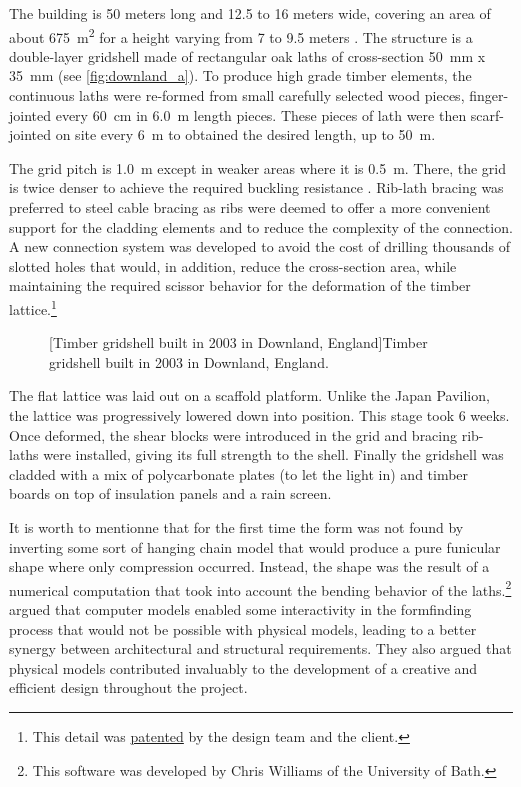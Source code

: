 The building is 50 meters long and 12.5 to 16 meters wide, covering an area of about \SI{675}{m^2} for a height varying from 7 to 9.5 meters \cite{Harris2002}. The structure is a double-layer gridshell made of rectangular oak laths of cross-section \SI{50}{mm} x \SI{35}{mm} (see \cref{fig:downland_a}). To produce high grade timber elements, the continuous laths were re-formed from small carefully selected wood pieces, finger-jointed every \SI{60}{cm} in \SI{6.0}{m} length pieces. These pieces of lath were then scarf-jointed on site every \SI{6}{m} to obtained the desired length, up to \SI{50}{m}.

The grid pitch is \SI{1.0}{m} except in weaker areas where it is \SI{0.5}{m}. There, the grid is twice denser to achieve the required buckling resistance \cite{Harris2003}. Rib-lath bracing was preferred to steel cable bracing as ribs were deemed to offer a more convenient support for the cladding elements and to reduce the complexity of the connection. A new connection system was developed to avoid the cost of drilling thousands of slotted holes that would, in addition, reduce the cross-section area, while maintaining the required scissor behavior for the deformation of the timber lattice.\footnote{This detail was \href{https://patents.google.com/patent/GB2361504A/en?q=\%22A+coupling+and+a+method+of+constructing+grid+shell+buildings+using+such+a+coupling\%22&country=GB}{patented} by the design team and the client.}
 \begin{figure}[h]
		\hspace*{\fill}
		\vspace{10pt}
		[Timber gridshell built in 2003 in Downland, England]{Timber gridshell built in 2003 in Downland, England.}
		\label{fig:downland} 
\end{figure}

The flat lattice was laid out on a scaffold platform. Unlike the Japan Pavilion, the lattice was progressively lowered down into position. This stage took 6 weeks. Once deformed, the shear blocks were introduced in the grid and bracing rib-laths were installed, giving its full strength to the shell. Finally the gridshell was cladded with a mix of polycarbonate plates (to let the light in) and timber boards on top of insulation panels and a rain screen.

It is worth to mentionne that for the first time the form was not found by inverting some sort of hanging chain model that would produce a pure funicular shape where only compression occurred. Instead, the shape was the result of a numerical computation that took into account the bending behavior of the laths.\footnote{This software was developed by Chris Williams of the University of Bath.} \citet{Harris2003} argued that computer models enabled some interactivity in the formfinding process that would not be possible with physical models, leading to a better synergy between architectural and structural requirements. They also argued that physical models contributed invaluably to the development of a creative and efficient design throughout the project.

